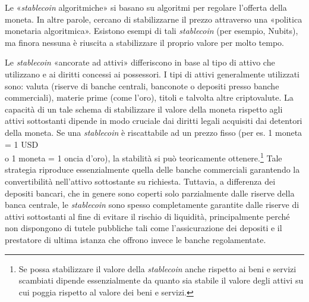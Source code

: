 \documentclass[a4paper]{article}
\begin{document}
Le «\textit{stablecoin} algoritmiche» si basano su algoritmi per regolare
l'offerta della moneta. In altre parole, cercano di stabilizzarne il
prezzo attraverso una «politica monetaria algoritmica». Esistono
esempi di tali \textit{stablecoin} (per esempio, Nubits), ma finora nessuna è
riuscita a stabilizzare il proprio valore per molto tempo.

Le \textit{stablecoin} «ancorate ad attivi» differiscono in base al tipo
di attivo che utilizzano e ai diritti concessi ai possessori. I tipi di
attivi generalmente utilizzati sono: valuta (riserve di banche centrali,
banconote o depositi presso banche commerciali), materie prime (come
l'oro), titoli e talvolta altre criptovalute. La capacità di un tale
schema di stabilizzare il valore della moneta rispetto agli attivi
sottostanti dipende in modo cruciale dai diritti legali acquisiti dai
detentori della moneta. Se una \textit{stablecoin} è riscattabile ad un
prezzo fisso (per es. 1 moneta = 1 USD \\ o 1 moneta = 1 oncia d'oro),
la stabilità si può teoricamente ottenere.\footnote{Se possa stabilizzare
il valore della \textit{stablecoin} anche rispetto ai beni e servizi
scambiati dipende essenzialmente da quanto sia stabile il valore degli
attivi su cui poggia rispetto al valore dei beni e servizi.} Tale strategia
riproduce essenzialmente quella delle banche commerciali garantendo la
convertibilità nell'attivo sottostante su richiesta. Tuttavia, a differenza
dei depositi bancari, che in genere sono coperti solo parzialmente dalle
riserve della banca centrale, le  \textit{stablecoin} sono spesso
completamente garantite dalle riserve di attivi sottostanti al fine di
evitare il rischio di liquidità, principalmente perché non dispongono di
tutele pubbliche tali come l'assicurazione dei depositi e il prestatore
di ultima istanza che offrono invece le banche regolamentate.
\end{document}
